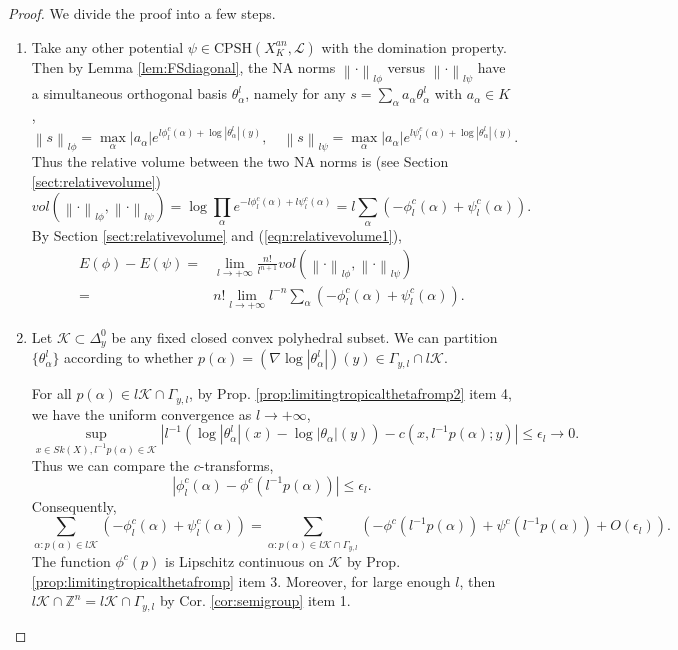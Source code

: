 \documentclass[a4paper]{article}
\theoremstyle{definition}
\newcommand{\Z}{\mathbb{Z}}
\newcommand{\norm}[1]{\left\lVert#1\right\rVert}
\begin{document}
		\begin{proof}
			We divide the proof into a few steps.
			
			
			\begin{enumerate}
				\item  	Take any other potential $\psi\in \text{CPSH}(X_K^{an},\mathcal{L})$ with the domination property. Then by Lemma \ref{lem:FSdiagonal}, the NA norms $\norm{\cdot}_{l\phi}$ versus $\norm{\cdot}_{l\psi}$ have a simultaneous orthogonal basis $\theta_\alpha^l$, namely for any $s=\sum_\alpha a_\alpha \theta_\alpha^l $ with $a_\alpha\in K$, 
				\[
				\norm{s }_{l\phi}= \max_\alpha |a_\alpha| e^{l \phi^c_l(\alpha) + \log |\theta_\alpha^l|(y)},\quad 
				\norm{s }_{l\psi}= \max_\alpha |a_\alpha | e^{l \psi^c_l(\alpha) + \log |\theta_\alpha^l|(y)}.
				\]
				Thus  the relative volume between the two NA norms  is (see Section \ref{sect:relativevolume})
				\begin{equation}\label{eqn:relativevolume1}
					vol(  \norm{\cdot}_{l\phi}, \norm{\cdot}_{l\psi}  )= \log \prod_{  \alpha } e^{-l \phi^c_l(\alpha)+l \psi^c_l(\alpha)} = l\sum_{ \alpha }  ( - \phi^c_l(\alpha)+\psi^c_l(\alpha) ).
				\end{equation}
				By Section \ref{sect:relativevolume} and (\ref{eqn:relativevolume1}), 
				\[
				\begin{split}
					E(\phi)-E(\psi)=& \lim_{l\to+\infty} \frac{n!}{  l^{n+1}  } 	vol(  \norm{\cdot}_{l\phi}, \norm{\cdot}_{l\psi}  )
					\\
					= & n!  \lim_{l\to+\infty} l^{-n} \sum_{  \alpha }  (-\phi^c_l(\alpha )+ \psi^c_l(\alpha)).
				\end{split}
				\]
				
						
				
				
				
				\item Let $\mathcal{K}\subset \Delta_y^0$ be any fixed closed convex polyhedral subset. We can partition $\{ \theta_\alpha^l \}$ according to whether $p(\alpha)=(\nabla \log |\theta_\alpha^l|)(y) \in \Gamma_{y,l}\cap l \mathcal{K}$.
				
				
				For all $p(\alpha)\in l \mathcal{K}\cap \Gamma_{y,l}$, by Prop. \ref{prop:limitingtropicalthetafromp2} item 4, we have the uniform convergence as $l\to +\infty$,
					\[
				\sup_{ x\in Sk(X) , l^{-1}p(\alpha) \in \mathcal{K} } |    l^{-1}(\log |\theta_\alpha^l|(x)- \log |\theta_\alpha|(y) )- c(x,  l^{-1} p(\alpha);y) | \leq \epsilon_l\to 0.
				\]
				Thus we can compare the $c$-transforms,
				\[
				|\phi_l^c(\alpha) - \phi^c( l^{-1} p(\alpha) ) | \leq \epsilon_l.
				\]
				Consequently, 
				\[
				\sum_{ \alpha: p(\alpha)\in l \mathcal{K} }  ( - \phi^c_l(\alpha)+\psi^c_l(\alpha) )= \sum_{ \alpha: p(\alpha)\in l\mathcal{K} \cap \Gamma_{y,l} }  ( - \phi^c( l^{-1} p(\alpha) )+\psi^c ( l^{-1}p(\alpha) ) + O(\epsilon_l)).
				\]
				The function $\phi^c(p)$ is Lipschitz continuous on $\mathcal{K}$ by Prop. \ref{prop:limitingtropicalthetafromp} item 3. Moreover, for large enough $l$, then $l \mathcal{K}\cap \Z^n= l \mathcal{K}\cap \Gamma_{y,l}$ by Cor. \ref{cor:semigroup} item 1. 
				

\end{enumerate}
\end{proof}
\end{document}
